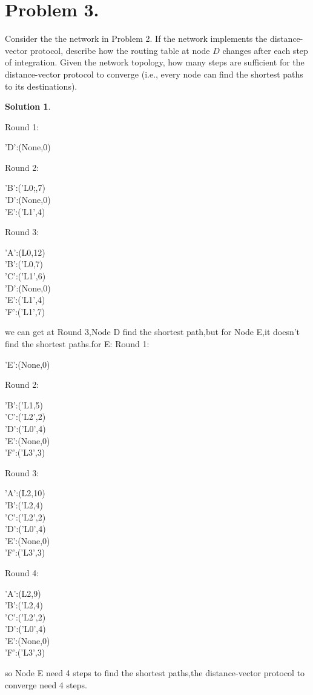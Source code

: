 \documentclass[UTF8,oneside]{article}
\newtheorem*{Solution}{Solution}
\begin{document}
\section*{Problem 3.}
Consider the the network in Problem 2. If the network implements the distance-vector protocol, describe how the routing table at node $D$ changes after each step of integration. Given the network topology, how many steps are sufficient for the distance-vector protocol to converge (i.e., every node can find the shortest paths to its destinations).
\begin{Solution}
\end{Solution}
Round 1:
\begin{center}
{'D':(None,0)}
\end{center}
Round 2:
\begin{center}
{'B':('L0;,7)\\
'D':(None,0)\\
'E':('L1',4)}
\end{center}
Round 3:
\begin{center}
{'A':(L0,12)\\
'B':('L0,7)\\
'C':('L1',6)\\
'D':(None,0)\\
'E':('L1',4)\\
'F':('L1',7)}
\end{center}
we can get at Round 3,Node D find the shortest path,but for Node E,it doesn't find the shortest paths.for E:
Round 1:
\begin{center}
{'E':(None,0)}
\end{center}
Round 2:
\begin{center}
{'B':('L1,5)\\
'C':('L2',2)\\
'D':('L0',4)\\
'E':(None,0)\\
'F':('L3',3)}
\end{center}
Round 3:
\begin{center}
{'A':(L2,10)\\
'B':('L2,4)\\
'C':('L2',2)\\
'D':('L0',4)\\
'E':(None,0)\\
'F':('L3',3)}
\end{center}
Round 4:
\begin{center}
{'A':(L2,9)\\
'B':('L2,4)\\
'C':('L2',2)\\
'D':('L0',4)\\
'E':(None,0)\\
'F':('L3',3)}
\end{center}
so Node E need 4 steps to find the shortest paths,the distance-vector protocol to converge need 4 steps.
\end{document}
